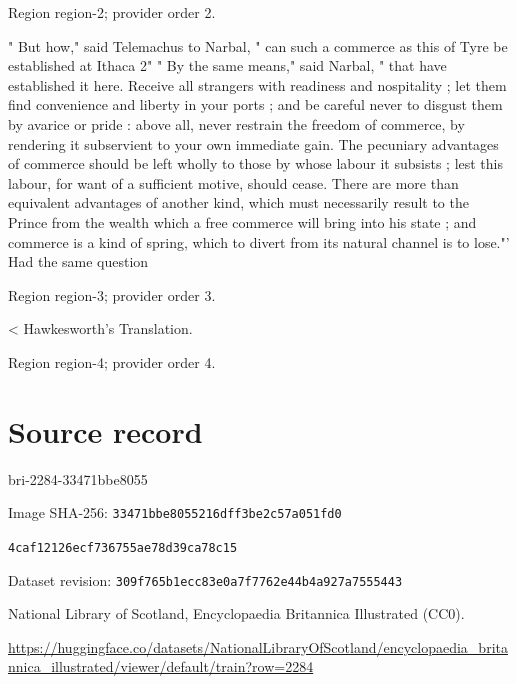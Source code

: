 \documentclass[11pt]{article}
\begin{document}
{\scriptsize\color{gray} Region region-2; provider order 2.\par}
\medskip

" But how," said Telemachus to Narbal, " can such a commerce as this of Tyre be esta­blished at Ithaca 2" " By the same means," said Narbal, " that have established it here. Receive all strangers with readiness and nospitality ; let them find convenience and liberty in your ports ; and be careful never to disgust them by avarice or pride : above all, never restrain the freedom of commerce, by rendering it subservient to your own immediate gain. The pecuniary advantages of commerce should be left wholly to those by whose labour it subsists ; lest this labour, for want of a sufficient motive, should cease. There are more than equivalent advantages of another kind, which must necessarily result to the Prince from the wealth which a free commerce will bring into his state ; and commerce is a kind of spring, which to divert from its natural channel is to lose."' Had the same question
\par

{\scriptsize\color{gray} Region region-3; provider order 3.\par}
\medskip

< Hawkesworth's Translation.
\par

{\scriptsize\color{gray} Region region-4; provider order 4.\par}
\medskip
\newpage\section*{Source record}
bri-2284-33471bbe8055\par
Image SHA-256: \texttt{33471bbe8055216dff3be2c57a051fd0}\par\texttt{4caf12126ecf736755ae78d39ca78c15}\par
Dataset revision: \texttt{309f765b1ecc83e0a7f7}\texttt{762e44b4a927a7555443}\par
National Library of Scotland, Encyclopaedia Britannica Illustrated (CC0).\par
\url{https://huggingface.co/datasets/NationalLibraryOfScotland/encyclopaedia_britannica_illustrated/viewer/default/train?row=2284}
\end{document}
